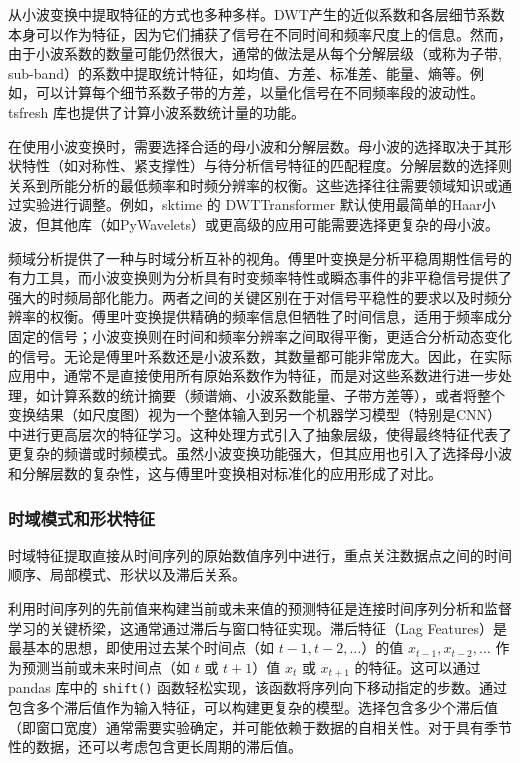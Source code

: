 从小波变换中提取特征的方式也多种多样。DWT产生的近似系数和各层细节系数本身可以作为特征，因为它们捕获了信号在不同时间和频率尺度上的信息。然而，由于小波系数的数量可能仍然很大，通常的做法是从每个分解层级（或称为子带, sub-band）的系数中提取统计特征，如均值、方差、标准差、能量、熵等。例如，可以计算每个细节系数子带的方差，以量化信号在不同频率段的波动性。tsfresh 库也提供了计算小波系数统计量的功能。

在使用小波变换时，需要选择合适的母小波和分解层数。母小波的选择取决于其形状特性（如对称性、紧支撑性）与待分析信号特征的匹配程度。分解层数的选择则关系到所能分析的最低频率和时频分辨率的权衡。这些选择往往需要领域知识或通过实验进行调整。例如，sktime 的 DWTTransformer 默认使用最简单的Haar小波，但其他库（如PyWavelets）或更高级的应用可能需要选择更复杂的母小波。

频域分析提供了一种与时域分析互补的视角。傅里叶变换是分析平稳周期性信号的有力工具，而小波变换则为分析具有时变频率特性或瞬态事件的非平稳信号提供了强大的时频局部化能力。两者之间的关键区别在于对信号平稳性的要求以及时频分辨率的权衡。傅里叶变换提供精确的频率信息但牺牲了时间信息，适用于频率成分固定的信号；小波变换则在时间和频率分辨率之间取得平衡，更适合分析动态变化的信号。无论是傅里叶系数还是小波系数，其数量都可能非常庞大。因此，在实际应用中，通常不是直接使用所有原始系数作为特征，而是对这些系数进行进一步处理，如计算系数的统计摘要（频谱熵、小波系数能量、子带方差等），或者将整个变换结果（如尺度图）视为一个整体输入到另一个机器学习模型（特别是CNN）中进行更高层次的特征学习。这种处理方式引入了抽象层级，使得最终特征代表了更复杂的频谱或时频模式。虽然小波变换功能强大，但其应用也引入了选择母小波和分解层数的复杂性，这与傅里叶变换相对标准化的应用形成了对比。

\subsubsection{时域模式和形状特征}
\label{sec:ts_subsequence_pattern}
时域特征提取直接从时间序列的原始数值序列中进行，重点关注数据点之间的时间顺序、局部模式、形状以及滞后关系。

利用时间序列的先前值来构建当前或未来值的预测特征是连接时间序列分析和监督学习的关键桥梁，这通常通过滞后与窗口特征实现。滞后特征（Lag Features）是最基本的思想，即使用过去某个时间点（如 $t-1, t-2, \dots$）的值 $x_{t-1}, x_{t-2}, \dots$ 作为预测当前或未来时间点（如 $t$ 或 $t+1$）值 $x_t$ 或 $x_{t+1}$ 的特征。这可以通过 pandas 库中的 \texttt{shift()} 函数轻松实现，该函数将序列向下移动指定的步数。通过包含多个滞后值作为输入特征，可以构建更复杂的模型。选择包含多少个滞后值（即窗口宽度）通常需要实验确定，并可能依赖于数据的自相关性。对于具有季节性的数据，还可以考虑包含更长周期的滞后值。

